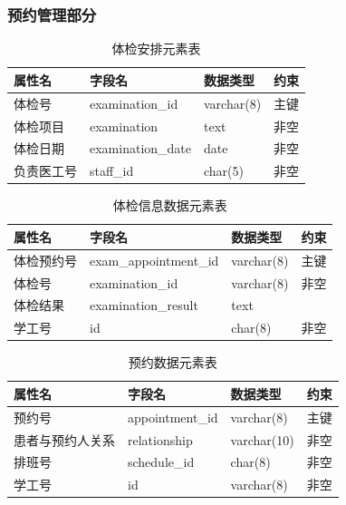 \documentclass{article}
\begin{document}
\subsubsection{预约管理部分}

\begin{table}[H]
    \centering
    \begin{tabularx}{\textwidth}{|>{\raggedright\arraybackslash}X|>{\raggedright\arraybackslash}X|>{\raggedright\arraybackslash}X|>{\raggedright\arraybackslash}X|}
    \toprule
    \textbf{属性名} & \textbf{字段名} & \textbf{数据类型} & \textbf{约束} \\ \midrule
    体检号 & examination\_id & varchar(8) & 主键 \\ \midrule
    体检项目 & examination & text & 非空 \\ \midrule
    体检日期 & examination\_date & date & 非空 \\ \midrule
    负责医工号 & staff\_id & char(5) & 非空 \\ \bottomrule
    \end{tabularx}
    \caption{体检安排元素表}
    \label{tab:examination_arrangement_elements}
\end{table}

\begin{table}[H]
    \centering
    \begin{tabularx}{\textwidth}{|>{\raggedright\arraybackslash}X|>{\raggedright\arraybackslash}X|>{\raggedright\arraybackslash}X|>{\raggedright\arraybackslash}X|}
    \toprule
    \textbf{属性名} & \textbf{字段名} & \textbf{数据类型} & \textbf{约束} \\ \midrule
    体检预约号 & exam\_appointment\_id & varchar(8) & 主键 \\ \midrule
    体检号 & examination\_id & varchar(8) & 非空 \\ \midrule
    体检结果 & examination\_result & text &  \\ \midrule
    学工号 & id & char(8) & 非空 \\ \bottomrule
    \end{tabularx}
    \caption{体检信息数据元素表}
    \label{tab:examination_appointment_elements}
\end{table}

\begin{table}[H]
    \centering
    \begin{tabularx}{\textwidth}{|>{\raggedright\arraybackslash}X|>{\raggedright\arraybackslash}X|>{\raggedright\arraybackslash}X|>{\raggedright\arraybackslash}X|}
    \toprule
    \textbf{属性名} & \textbf{字段名} & \textbf{数据类型} & \textbf{约束} \\ \midrule
    预约号 & appointment\_id & varchar(8) & 主键 \\ \midrule
    患者与预约人关系 & relationship & varchar(10) & 非空 \\ \midrule
    排班号 & schedule\_id & char(8) & 非空 \\ \midrule
    学工号 & id & varchar(8) & 非空 \\ \bottomrule
    \end{tabularx}
    \caption{预约数据元素表}
    \label{tab:appointment_elements}
\end{table}
\end{document}
